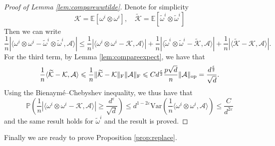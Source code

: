 \documentclass[letterpaper, 10pt, dvipsnames]{article}
\numberwithin{equation}{section}
\newcommand{\A}{\mathcal{A}}
\newcommand{\wt}{\widetilde}
\let\O\relax
\newcommand{\O}[1]{\mathcal{O}\left(#1\right)}
\renewcommand{\P}{\mathds{P}}
\newcommand{\E}{\mathds{E}}
\theoremstyle{definition}
\begin{document}
\begin{proof}[Proof of Lemma \ref{lem:comparewwtilde}]
  Denote for simplicity 
  \[
  \mathcal{K}=\E\left[
    \omega^i\otimes \omega^i
  \right],\quad \wt{\mathcal{K}}=\E\left[
    \wt{\omega}^i\otimes \wt{\omega}^i
  \right]
  \]
  Then we can write 
  \[
  \frac{1}{n}\left\vert 
          \langle \omega^i\otimes \omega^i - \wt{\omega}^i\otimes \wt{\omega}^i,\A\rangle  
  \right\vert
  \leqslant  
  \frac{1}{n}\left\vert
    \langle \omega^i\otimes \omega^i -\mathcal{K},\A\rangle
  \right\vert
  +
  \frac{1}{n}\left\vert
    \langle \wt{\omega}^i\otimes \wt{\omega}^i -\wt{\mathcal{K}},\A\rangle
  \right\vert 
  +
  \frac{1}{n}\left\vert
    \langle \wt{\mathcal{K}}-\mathcal{K},\A\rangle
  \right\vert.  
  \]
  For the third term, by Lemma \ref{lem:compareexpect}, we have that 
  \[
  \frac{1}{n}\langle \wt{\mathcal{K}}-\mathcal{K},\A\rangle 
  \leqslant 
  \frac{1}{n}\Vert \wt{\mathcal{K}}-\mathcal{K}\Vert_{\mathrm{F}}\Vert \A\Vert_{\mathrm{F}}
  \leqslant Cd^{\frac{\varepsilon}{2}}\frac{p\sqrt{d}}{n}\Vert \A\Vert_{\mathrm{op}}
  =
  \O{\frac{d^{\frac{\varepsilon}{2}}}{\sqrt{d}}}.  
  \]
  Using the Bienaym\'e--Chebyshev inequality, we thus have that 
    \[
    \P\left(
      \frac{1}{n}\left\vert 
        \langle
          \omega^i\otimes \omega^i-\mathcal{K},\A 
        \rangle
      \right\vert
      \geqslant \frac{d^\varepsilon}{\sqrt{d}}
    \right)  
    \leqslant d^{1-2\varepsilon}
    \mathrm{Var}\left(
      \frac{1}{n}\langle 
        \omega^i\otimes \omega^i,\A
      \rangle
    \right)
    \leqslant \frac{C}{d^{2\varepsilon}}
    \]
    and the same result holds for $\wt{\omega}^i$ and the result is proved.
\end{proof}
Finally we are ready to prove Proposition \ref{prop:replace}.
\end{document}
